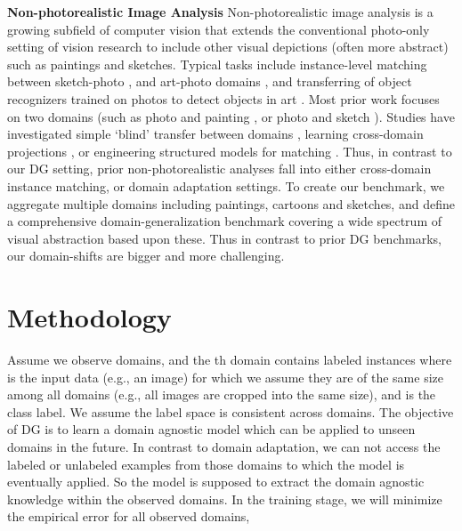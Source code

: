 \documentclass[10pt,twocolumn,letterpaper]{article}
\begin{document}
\noindent\textbf{Non-photorealistic Image Analysis}\quad
Non-photorealistic image analysis is a growing subfield of computer vision that extends the conventional photo-only setting of vision research to include other visual depictions (often more abstract) such as paintings and sketches. Typical tasks include instance-level matching between sketch-photo \cite{yu2016sketchShoe,sangkloy2016sketchy}, and art-photo domains \cite{crowley2015facePainting}, and transferring of object recognizers trained on photos to detect objects in art \cite{crowley2016artDetection,wu2014matchAcrossStyle}. Most prior work focuses on two domains (such as photo and painting \cite{crowley2016artDetection,wu2014matchAcrossStyle}, or photo and sketch \cite{yu2016sketchShoe,sangkloy2016sketchy}). Studies have investigated simple `blind' transfer between domains \cite{crowley2016artDetection}, learning cross-domain projections \cite{yu2016sketchShoe,crowley2015facePainting}, or engineering structured models for matching \cite{wu2014matchAcrossStyle}. Thus, in contrast to our DG setting, prior non-photorealistic analyses fall into either cross-domain instance matching, or domain adaptation settings. To create our benchmark, we aggregate multiple domains including paintings, cartoons and sketches, and define a comprehensive domain-generalization benchmark covering a wide spectrum of visual abstraction based upon these. Thus in contrast to prior DG benchmarks, our domain-shifts are bigger and more challenging. 

\section{Methodology}

Assume we observe  domains, and the th domain contains  labeled instances   where  is the input data (e.g., an image) for which we assume they are of the same size among all domains (e.g., all images are cropped into the same size), and  is the class label. We assume the label space is consistent across domains. The objective of DG is to learn a domain agnostic model which can be applied to unseen domains in the future. In contrast to domain adaptation, we can not access the labeled or unlabeled examples from those domains to which the model is eventually applied. So the model is supposed to extract the domain agnostic knowledge within the observed domains. In the training stage, we will minimize the empirical error for all observed domains,
\end{document}
